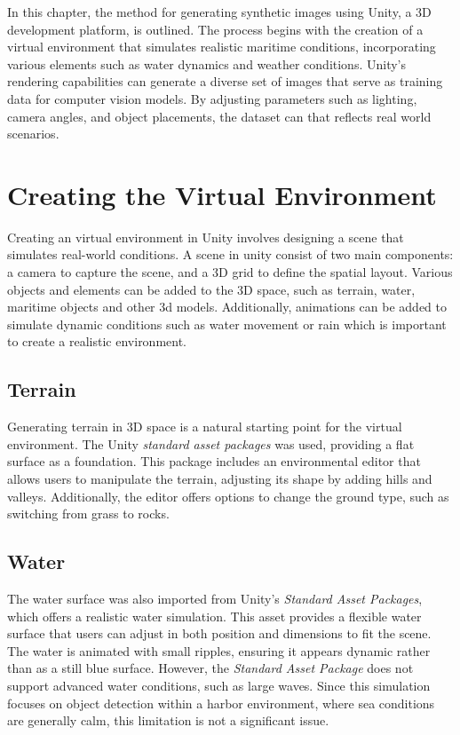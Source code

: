 
In this chapter, the method for generating synthetic images using Unity, a 3D development platform, is outlined. The process begins with the creation of a virtual environment that simulates realistic maritime conditions, incorporating various elements such as water dynamics and weather conditions. Unity's rendering capabilities can generate a diverse set of images that serve as training data for computer vision models. By adjusting parameters such as lighting, camera angles, and object placements, the dataset can that reflects real world scenarios. 


\section{Creating the Virtual Environment}
Creating an virtual environment in Unity involves designing a scene that simulates real-world conditions. A scene in unity consist of two main components: a camera to capture the scene, and a 3D grid to define the spatial layout. Various objects and elements can be added to the 3D space, such as terrain, water, maritime objects and other 3d models. Additionally, animations can be added to simulate dynamic conditions such as water movement or rain which is important to create a realistic environment. 
 
\subsection{Terrain}
Generating terrain in 3D space is a natural starting point for the virtual environment. The Unity \textit{standard asset packages} was used, providing a flat surface as a foundation. This package includes an environmental editor that allows users to manipulate the terrain, adjusting its shape by adding hills and valleys. Additionally, the editor offers options to change the ground type, such as switching from grass to rocks.

\subsection{Water}
The water surface was also imported from Unity's \textit{Standard Asset Packages}, which offers a realistic water simulation. This asset provides a flexible water surface that users can adjust in both position and dimensions to fit the scene. The water is animated with small ripples, ensuring it appears dynamic rather than as a still blue surface. However, the \textit{Standard Asset Package} does not support advanced water conditions, such as large waves. Since this simulation focuses on object detection within a harbor environment, where sea conditions are generally calm, this limitation is not a significant issue.

